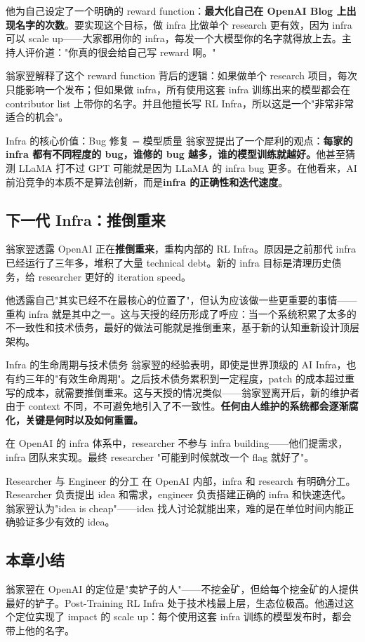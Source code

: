 他为自己设定了一个明确的 reward function：\textbf{最大化自己在 OpenAI Blog 上出现名字的次数}。要实现这个目标，做 infra 比做单个 research 更有效，因为 infra 可以 scale up——大家都用你的 infra，每发一个大模型你的名字就得放上去。主持人评价道："你真的很会给自己写 reward 啊。"

翁家翌解释了这个 reward function 背后的逻辑：如果做单个 research 项目，每次只能影响一个发布；但如果做 infra，所有使用这套 infra 训练出来的模型都会在 contributor list 上带你的名字。并且他擅长写 RL Infra，所以这是一个"非常非常适合的机会"。

\begin{importantbox}{Infra 的核心价值：Bug 修复 = 模型质量}
翁家翌提出了一个犀利的观点：\textbf{每家的 infra 都有不同程度的 bug，谁修的 bug 越多，谁的模型训练就越好。}他甚至猜测 LLaMA 打不过 GPT 可能就是因为 LLaMA 的 infra bug 更多。在他看来，AI 前沿竞争的本质不是算法创新，而是\textbf{infra 的正确性和迭代速度}。
\end{importantbox}

\subsection{下一代 Infra：推倒重来}

翁家翌透露 OpenAI 正在\textbf{推倒重来}，重构内部的 RL Infra。原因是之前那代 infra 已经运行了三年多，堆积了大量 technical debt。新的 infra 目标是清理历史债务，给 researcher 更好的 iteration speed。

他透露自己"其实已经不在最核心的位置了"，但认为应该做一些更重要的事情——重构 infra 就是其中之一。这与天授的经历形成了呼应：当一个系统积累了太多的不一致性和技术债务，最好的做法可能就是推倒重来，基于新的认知重新设计顶层架构。

\begin{warningbox}{Infra 的生命周期与技术债务}
翁家翌的经验表明，即使是世界顶级的 AI Infra，也有约三年的"有效生命周期"。之后技术债务累积到一定程度，patch 的成本超过重写的成本，就需要推倒重来。这与天授的情况类似——翁家翌离开后，新的维护者由于 context 不同，不可避免地引入了不一致性。\textbf{任何由人维护的系统都会逐渐腐化，关键是何时以及如何重置。}
\end{warningbox}

在 OpenAI 的 infra 体系中，researcher 不参与 infra building——他们提需求，infra 团队来实现。最终 researcher "可能到时候就改一个 flag 就好了"。

\begin{knowledgebox}{Researcher 与 Engineer 的分工}
在 OpenAI 内部，infra 和 research 有明确分工。Researcher 负责提出 idea 和需求，engineer 负责搭建正确的 infra 和快速迭代。翁家翌认为"idea is cheap"——idea 找人讨论就能出来，难的是在单位时间内能正确验证多少有效的 idea。
\end{knowledgebox}

\subsection{本章小结}

翁家翌在 OpenAI 的定位是"卖铲子的人"——不挖金矿，但给每个挖金矿的人提供最好的铲子。Post-Training RL Infra 处于技术栈最上层，生态位极高。他通过这个定位实现了 impact 的 scale up：每个使用这套 infra 训练的模型发布时，都会带上他的名字。


